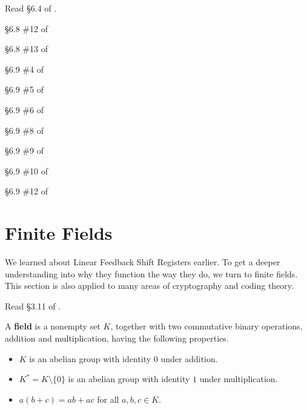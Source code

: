 Read \S6.4 of \cite{tw}.

\begin{problem}[10 points]
	\S 6.8 \#12 of \cite {tw}
\end{problem}

\begin{problem}[10 points]
	\S 6.8 \#13 of \cite {tw}
\end{problem}

\begin{problem}[10 points]
	\S 6.9 \#4 of \cite {tw}
\end{problem}

\begin{problem}[10 points]
	\S 6.9 \#5 of \cite {tw}
\end{problem}

\begin{problem}[10 points]
	\S 6.9 \#6 of \cite {tw}
\end{problem}

\begin{problem}[10 points]
	\S 6.9 \#8 of \cite {tw}
\end{problem}

\begin{problem}[10 points]
	\S 6.9 \#9 of \cite {tw}
\end{problem}

\begin{problem}[10 points]
	\S 6.9 \#10 of \cite {tw}
\end{problem}

\begin{problem}[10 points]
	\S 6.9 \#12 of \cite {tw}
\end{problem}

	\section{Finite Fields}

We learned about Linear Feedback Shift Registers earlier. To get a deeper understanding into why they function the way they do, we turn to finite fields. This section is also applied to many areas of cryptography and coding theory.

Read \S 3.11 of \cite{tw}.

	\begin{definition}
          A {\bf field} is a nonempty set $K$, together with two commutative binary operations, addition and multiplication, having the following properties.
          \begin{itemize}
            \item $K$ is an abelian group with identity $0$ under addition.
            \item $K^* = K\setminus\{0\}$ is an abelian group with identity $1$ under multiplication.
            \item $a(b+c) = ab + ac$ for all $a, b, c \in K$.
          \end{itemize}
        \end{definition}

